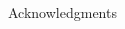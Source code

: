 \documentclass[final,hyperref={pdfpagelabels=false}]{beamer}
\begin{document}
\begin{frame}[t]
\begin{columns}[t]
\begin{column}{.465\textwidth}
\begin{block}{Acknowledgments}
\end{block}







\end{column} %

\begin{column}{.015\textwidth}\end{column} %

\end{columns} %

\end{frame} %
\end{document}
